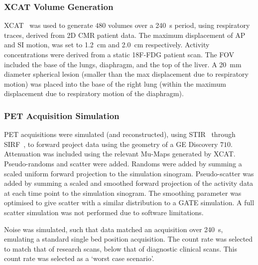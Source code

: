             \subsubsection{XCAT Volume Generation} \label{sec:pet_ct_motion_correction_exploiting_motion_models_fit_on_coarsely_gated_data_applied_to_finely_gated_data_methods_xcat_volume_generation}
                \gls{XCAT}~\parencite{Segars2010} was used to generate $480$ volumes over a \SI{240}{\second} period, using respiratory traces, derived from \gls{2D} \gls{CMR} patient data. The maximum displacement of \gls{AP} and \gls{SI} motion, was set to \SI{1.2}{\centi\metre} and \SI{2.0}{\centi\metre} respectively. Activity concentrations were derived from a static \gls{18F-FDG} patient scan. The \gls{FOV} included the base of the lungs, diaphragm, and the top of the liver. A \SI{20}{\milli\metre} diameter spherical lesion (smaller than the max displacement due to respiratory motion) was placed into the base of the right lung (within the maximum displacement due to respiratory motion of the diaphragm).
            
            \subsubsection{PET Acquisition Simulation} \label{sec:pet_ct_motion_correction_exploiting_motion_models_fit_on_coarsely_gated_data_applied_to_finely_gated_data_methods_pet_acquisition_simulation}
                \gls{PET} acquisitions were simulated (and reconstructed), using \gls{STIR}~\parencite{Thielemans2012, Nikos2019} through \gls{SIRF}~\parencite{Ovtchinnikov2017}, to forward project data using the geometry of a \gls{GE} Discovery $710$. Attenuation was included using the relevant \glspl{Mu-Map} generated by \gls{XCAT}. Pseudo-randoms and scatter were added. Randoms were added by summing a scaled uniform forward projection to the simulation sinogram. Pseudo-scatter was added by summing a scaled and smoothed forward projection of the activity data at each time point to the simulation sinogram. The smoothing parameter was optimised to give scatter with a similar distribution to a GATE simulation. A full scatter simulation was not performed due to software limitations.
                
                Noise was simulated, such that data matched an acquisition over \SI{240}{\second}, emulating a standard single bed position acquisition. The count rate was selected to match that of research scans, below that of diagnostic clinical scans. This count rate was selected as a `worst case scenario'.
                
